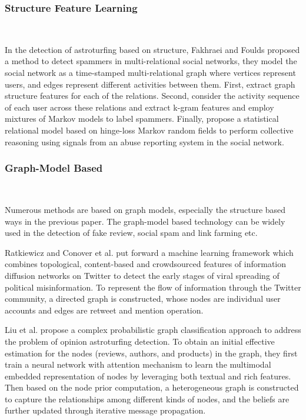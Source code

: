 \documentclass[lettersize,journal]{IEEEtran}
\begin{document}
\subsubsection{Structure Feature Learning}
\

In the detection of astroturfing based on structure, Fakhraei and Foulds \cite{Fakhraei2015Collective} proposed a method to detect spammers in multi-relational social networks, they model the social network as a time-stamped multi-relational graph where vertices represent users, and edges represent different activities between them. First, extract graph structure features for each of the relations. Second, consider the activity sequence of each user across these relations and extract k-gram features and employ mixtures of Markov models to label spammers. Finally, propose a statistical relational model based on hinge-loss Markov random fields to perform collective reasoning using signals from an abuse reporting system in the social network.


\subsubsection{Graph-Model Based}
\

Numerous methods are based on graph models, especially the structure based ways in the previous paper. \cite{Fakhraei2015Collective, Ghosh2012Understanding, Lee2010Uncovering} The graph-model based technology can be widely used in the detection of fake review, social spam \cite{Lee2010Uncovering,Hu2014Social}and link farming \cite{Ghosh2012Understanding} etc.

Ratkiewicz and Conover et al. \cite{Ratkiewicz2011Detecting} put forward a machine learning framework which combines topological, content-based and crowdsourced features of information diffusion networks on Twitter to detect the early stages of viral spreading of political misinformation. To represent the flow of information through the Twitter community, a directed graph is constructed, whose nodes are individual user accounts and edges are retweet and mention operation.

Liu et al. \cite{liu2019opinion} propose a complex probabilistic graph classification approach to address the problem of opinion astroturfing detection. To obtain an initial effective estimation for the nodes (reviews, authors, and products) in the graph, they first train a neural network with attention mechanism to learn the multimodal embedded representation of nodes by leveraging both textual and rich features. Then based on the node prior computation, a heterogeneous graph is constructed to capture the relationships among different kinds of nodes, and the beliefs are further updated through iterative message propagation. 
\end{document}

